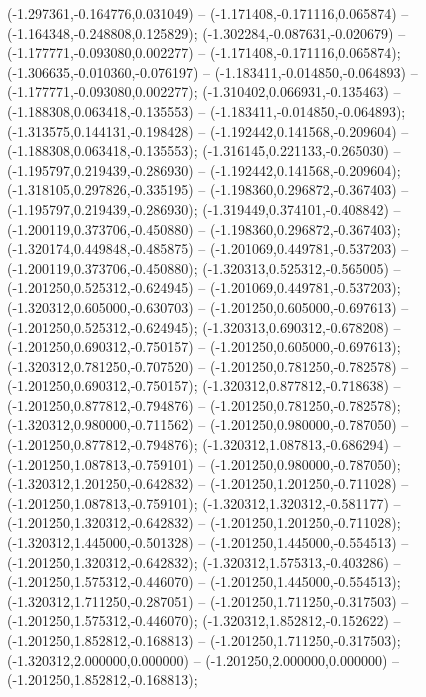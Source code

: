  (-1.297361,-0.164776,0.031049) -- (-1.171408,-0.171116,0.065874) -- (-1.164348,-0.248808,0.125829);
 (-1.302284,-0.087631,-0.020679) -- (-1.177771,-0.093080,0.002277) -- (-1.171408,-0.171116,0.065874);
 (-1.306635,-0.010360,-0.076197) -- (-1.183411,-0.014850,-0.064893) -- (-1.177771,-0.093080,0.002277);
 (-1.310402,0.066931,-0.135463) -- (-1.188308,0.063418,-0.135553) -- (-1.183411,-0.014850,-0.064893);
 (-1.313575,0.144131,-0.198428) -- (-1.192442,0.141568,-0.209604) -- (-1.188308,0.063418,-0.135553);
 (-1.316145,0.221133,-0.265030) -- (-1.195797,0.219439,-0.286930) -- (-1.192442,0.141568,-0.209604);
 (-1.318105,0.297826,-0.335195) -- (-1.198360,0.296872,-0.367403) -- (-1.195797,0.219439,-0.286930);
 (-1.319449,0.374101,-0.408842) -- (-1.200119,0.373706,-0.450880) -- (-1.198360,0.296872,-0.367403);
 (-1.320174,0.449848,-0.485875) -- (-1.201069,0.449781,-0.537203) -- (-1.200119,0.373706,-0.450880);
 (-1.320313,0.525312,-0.565005) -- (-1.201250,0.525312,-0.624945) -- (-1.201069,0.449781,-0.537203);
 (-1.320312,0.605000,-0.630703) -- (-1.201250,0.605000,-0.697613) -- (-1.201250,0.525312,-0.624945);
 (-1.320313,0.690312,-0.678208) -- (-1.201250,0.690312,-0.750157) -- (-1.201250,0.605000,-0.697613);
 (-1.320312,0.781250,-0.707520) -- (-1.201250,0.781250,-0.782578) -- (-1.201250,0.690312,-0.750157);
 (-1.320312,0.877812,-0.718638) -- (-1.201250,0.877812,-0.794876) -- (-1.201250,0.781250,-0.782578);
 (-1.320312,0.980000,-0.711562) -- (-1.201250,0.980000,-0.787050) -- (-1.201250,0.877812,-0.794876);
 (-1.320312,1.087813,-0.686294) -- (-1.201250,1.087813,-0.759101) -- (-1.201250,0.980000,-0.787050);
 (-1.320312,1.201250,-0.642832) -- (-1.201250,1.201250,-0.711028) -- (-1.201250,1.087813,-0.759101);
 (-1.320312,1.320312,-0.581177) -- (-1.201250,1.320312,-0.642832) -- (-1.201250,1.201250,-0.711028);
 (-1.320312,1.445000,-0.501328) -- (-1.201250,1.445000,-0.554513) -- (-1.201250,1.320312,-0.642832);
 (-1.320312,1.575313,-0.403286) -- (-1.201250,1.575312,-0.446070) -- (-1.201250,1.445000,-0.554513);
 (-1.320312,1.711250,-0.287051) -- (-1.201250,1.711250,-0.317503) -- (-1.201250,1.575312,-0.446070);
 (-1.320312,1.852812,-0.152622) -- (-1.201250,1.852812,-0.168813) -- (-1.201250,1.711250,-0.317503);
 (-1.320312,2.000000,0.000000) -- (-1.201250,2.000000,0.000000) -- (-1.201250,1.852812,-0.168813);
